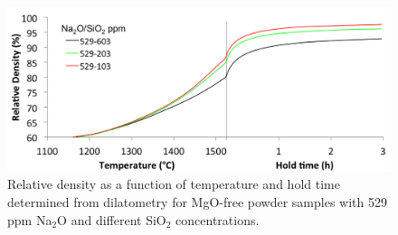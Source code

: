 \newpage
\begin{figure}[H]
	\centering
	\includegraphics[width=\textwidth]{Chapter-4/Figures/Figure2.png}
	\caption{Relative density as a function of temperature and hold time determined from dilatometry for MgO-free powder samples with 529 ppm Na$_{2}$O and different SiO$_{2}$ concentrations.}
	\label{Ch4-figure:Figure2}
\end{figure}

